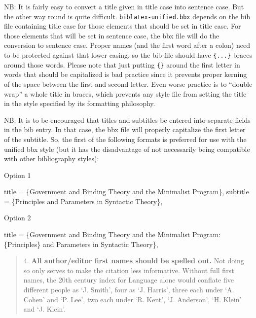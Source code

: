 \documentclass[
]{article}
\newenvironment{Shaded}{\begin{snugshade}}{\end{snugshade}}
\newcommand{\CommentTok}[1]{\textcolor[rgb]{0.54,0.53,0.53}{#1}}
\begin{document}
NB: It is fairly easy to convert a title given in title case into
sentence case. But the other way round is quite difficult.
\texttt{biblatex-unified.bbx} depends on the bib file containing title
case for those elements that should be set in title case. For those
elements that will be set in sentence case, the bbx file will do the
conversion to sentence case. Proper names (and the first word after a
colon) need to be protected against that lower casing, so the bib-file
should have \texttt{\{...\}} braces around those words. Please note that
just putting \texttt{\{\}} around the first letter in words that should
be capitalized is bad practice since it prevents proper kerning of the
space between the first and second letter. Even worse practice is to
``double wrap'' a whole title in braces, which prevents any style file
from setting the title in the style specified by its formatting
philosophy.

NB: It is to be encouraged that titles and subtitles be entered into
separate fields in the bib entry. In that case, the bbx file will
properly capitalize the first letter of the subtitle. So, the first of
the following formats is preferred for use with the unified bbx style
(but it has the disadvantage of not necessarily being compatible with
other bibliography styles):

Option 1

\begin{Shaded}
\begin{Highlighting}[]
\CommentTok{title = \{Government and Binding Theory and the Minimalist Program\},}
\CommentTok{subtitle = \{Principles and Parameters in Syntactic Theory\},}
\end{Highlighting}
\end{Shaded}

Option 2

\begin{Shaded}
\begin{Highlighting}[]
\CommentTok{title = \{Government and Binding Theory and the Minimalist Program:  }
\CommentTok{        \{Principles\} and Parameters in Syntactic Theory\},}
\end{Highlighting}
\end{Shaded}

\begin{quote}
4. \textbf{All author/editor first names should be spelled out.} Not
doing so only serves to make the citation less informative. Without full
first names, the 20th century index for Language alone would conflate
five different people as `J. Smith', four as `J. Harris', three each
under `A. Cohen' and `P. Lee', two each under `R. Kent', `J. Anderson',
`H. Klein' and `J. Klein'.
\end{quote}
\end{document}
